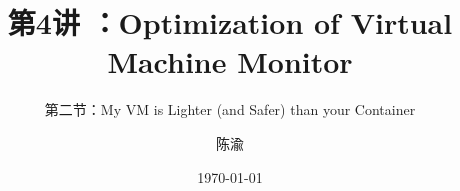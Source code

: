 


\title[第4讲]{第4讲 ：Optimization of Virtual Machine Monitor} %
\subtitle{第二节：My VM is Lighter (and Safer) than your Container}
\author{陈渝} %
\date{\today} %




\begin{frame}
\titlepage %
\end{frame}

%
%


